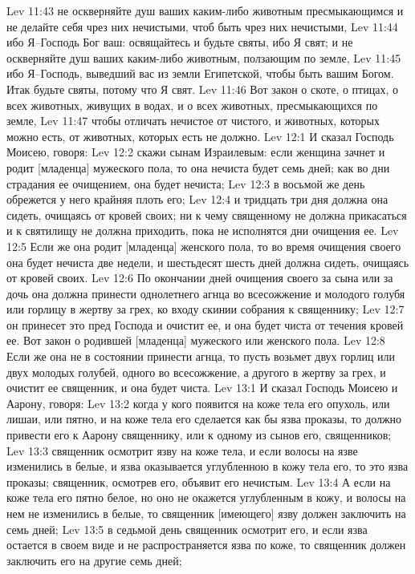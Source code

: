 Lev 11:43  не оскверняйте душ ваших каким-либо животным пресмыкающимся и не делайте себя чрез них нечистыми, чтоб быть чрез них нечистыми,
Lev 11:44  ибо Я--Господь Бог ваш: освящайтесь и будьте святы, ибо Я свят; и не оскверняйте душ ваших каким-либо животным, ползающим по земле,
Lev 11:45  ибо Я--Господь, выведший вас из земли Египетской, чтобы быть вашим Богом. Итак будьте святы, потому что Я свят.
Lev 11:46  Вот закон о скоте, о птицах, о всех животных, живущих в водах, и о всех животных, пресмыкающихся по земле,
Lev 11:47  чтобы отличать нечистое от чистого, и животных, которых можно есть, от животных, которых есть не должно.
Lev 12:1  И сказал Господь Моисею, говоря:
Lev 12:2  скажи сынам Израилевым: если женщина зачнет и родит [младенца] мужеского пола, то она нечиста будет семь дней; как во дни страдания ее очищением, она будет нечиста;
Lev 12:3  в восьмой же день обрежется у него крайняя плоть его;
Lev 12:4  и тридцать три дня должна она сидеть, очищаясь от кровей своих; ни к чему священному не должна прикасаться и к святилищу не должна приходить, пока не исполнятся дни очищения ее.
Lev 12:5  Если же она родит [младенца] женского пола, то во время очищения своего она будет нечиста две недели, и шестьдесят шесть дней должна сидеть, очищаясь от кровей своих.
Lev 12:6  По окончании дней очищения своего за сына или за дочь она должна принести однолетнего агнца во всесожжение и молодого голубя или горлицу в жертву за грех, ко входу скинии собрания к священнику;
Lev 12:7  он принесет это пред Господа и очистит ее, и она будет чиста от течения кровей ее. Вот закон о родившей [младенца] мужеского или женского пола.
Lev 12:8  Если же она не в состоянии принести агнца, то пусть возьмет двух горлиц или двух молодых голубей, одного во всесожжение, а другого в жертву за грех, и очистит ее священник, и она будет чиста.
Lev 13:1  И сказал Господь Моисею и Аарону, говоря:
Lev 13:2  когда у кого появится на коже тела его опухоль, или лишаи, или пятно, и на коже тела его сделается как бы язва проказы, то должно привести его к Аарону священнику, или к одному из сынов его, священников;
Lev 13:3  священник осмотрит язву на коже тела, и если волосы на язве изменились в белые, и язва оказывается углубленною в кожу тела его, то это язва проказы; священник, осмотрев его, объявит его нечистым.
Lev 13:4  А если на коже тела его пятно белое, но оно не окажется углубленным в кожу, и волосы на нем не изменились в белые, то священник [имеющего] язву должен заключить на семь дней;
Lev 13:5  в седьмой день священник осмотрит его, и если язва остается в своем виде и не распространяется язва по коже, то священник должен заключить его на другие семь дней;
